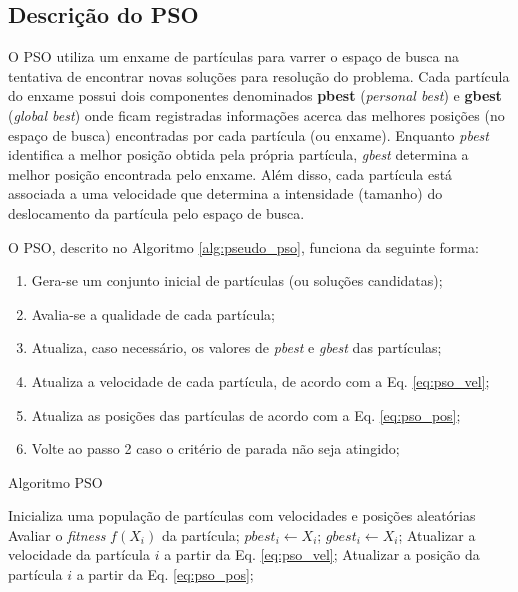 \documentclass[
	12pt,				%
	openany,			%
	oneside,	
	a4paper,			%
	brazil,				%
	]{unimontes-ppgmsc-abntex2}
\begin{document}
\subsection{Descrição do PSO}
\label{sec:desc_pso}

O PSO utiliza um enxame de partículas para varrer o espaço de busca na tentativa de encontrar novas soluções para resolução do problema. Cada partícula do enxame possui dois componentes denominados \textbf{pbest} ({\em personal best}) e \textbf{gbest} ({\em global best}) onde ficam registradas informações acerca das melhores posições (no espaço de busca) encontradas por cada partícula (ou enxame). Enquanto {\em pbest} identifica a melhor posição obtida pela própria partícula, {\em gbest} determina a melhor posição encontrada pelo enxame. Além disso, cada partícula está associada a uma velocidade que determina a intensidade (tamanho) do deslocamento da partícula pelo espaço de busca. 

O PSO, descrito no Algoritmo \ref{alg:pseudo_pso}, funciona da seguinte forma: 

\begin{enumerate}[label=\arabic*)]
\item Gera-se um conjunto inicial de partículas (ou soluções candidatas);
\item Avalia-se a qualidade de cada partícula;
\item Atualiza, caso necessário, os valores de {\em pbest} e {\em gbest} das partículas;
\item Atualiza a velocidade de cada partícula, de acordo com a Eq. \ref{eq:pso_vel};
\item Atualiza as posições das partículas de acordo com a Eq. \ref{eq:pso_pos};
\item Volte ao passo 2 caso o critério de parada não seja atingido;
\end{enumerate}

\begin{algorithm}[ht]
\caption{Algoritmo PSO}
\label{alg:pseudo_pso}
\begin{algorithmic}[1]
\State Inicializa uma população de partículas com velocidades e posições aleatórias
		\State Avaliar o \textit{fitness} $f(X_i)$ da partícula;
		   \State $pbest_i \gets X_i$;
		\EndIf
		   \State $gbest_i \gets X_i$;
		\EndIf
		\State Atualizar a velocidade da partícula $i$ a partir da Eq. \ref{eq:pso_vel};
		\State Atualizar a posição da partícula $i$ a partir da Eq. \ref{eq:pso_pos};
	\EndFor
\EndWhile
\end{algorithmic}
\end{algorithm}
\end{document}
